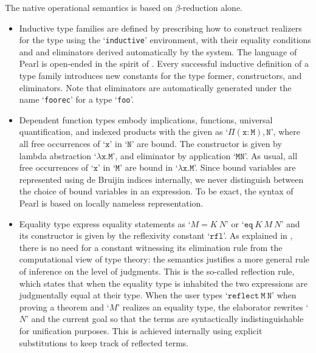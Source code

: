 \documentclass[a4paper]{article}
\begin{document}
The native operational semantics is based on $\beta$-reduction alone. 

%


\begin{itemize}
	\item Inductive type families are defined by prescribing how to construct realizers for the type using the `\texttt{inductive}' environment, with their equality conditions and and eliminators derived automatically by the system. The language of Pearl is open-ended in the spirit of \cite[\S9]{bentzen2026book}. Every successful inductive definition of a type family introduces new constants for the type former, constructors, and eliminators. Note that eliminators are automatically generated under the name `\texttt{foorec}' for a type `\texttt{foo}'. 
	
	\item Dependent function types embody implications, functions, universal quantification, and indexed products with the given as `$\mathtt{\Pi(x : M), N}$',
	where all free occurrences of `$\mathtt{x}$' in `$\mathtt{N}$' are bound. The constructor is given by
	lambda abstraction `$\mathtt{λ x.M}$', and eliminator by application `$\mathtt{M N}$'.
	As usual, all free occurrences of `$\mathtt{x}$' in `$\mathtt{M}$' are bound in `$\mathtt{λ x.M}$'. Since bound variables are represented using de Bruijin indices internally, we never
	distinguish between the choice of bound variables in an expression. To be exact, the syntax of Pearl is based on locally nameless representation.
	
	\item Equality type express equality statements as `$M = K\ N$' or `$\mathtt{eq} \ K \ M \ N$' and its constructor is given by the reflexivity constant `$\mathtt{rfl}$'. As explained in \cite{sterling2015typetheory,bentzen2026book}, there is no need for a constant witnessing its elimination rule from the computational view of type theory: the semantics justifies a more general rule of inference on the level of judgments. This is the so-called reflection rule, which states that when the equality type is inhabited the two expressions are judgmentally equal at their type. When the user types `$\mathtt{reflect \ M \ N}$' when proving a theorem and `$M$' realizes an equality type, the elaborator rewrites `$N$' and the current goal so that the terms are syntactically indistinguishable for unification purposes. This is achieved internally using explicit substitutions to keep track of reflected terms.
	

\end{itemize}
\end{document}
